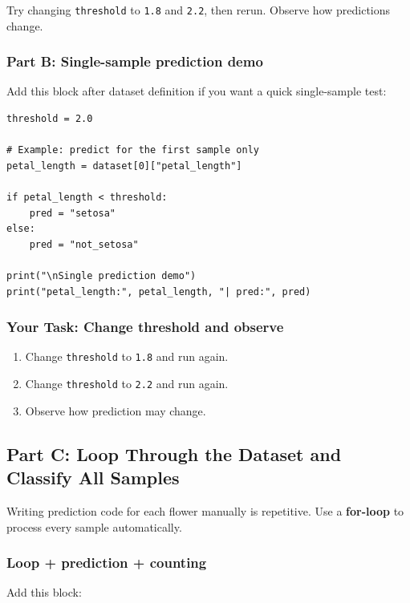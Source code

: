 Try changing \texttt{threshold} to \texttt{1.8} and \texttt{2.2}, then rerun. Observe how predictions change.

\subsubsection{Part B: Single-sample prediction demo}

Add this block after dataset definition if you want a quick single-sample test:

\begin{verbatim}
threshold = 2.0

# Example: predict for the first sample only
petal_length = dataset[0]["petal_length"]

if petal_length < threshold:
    pred = "setosa"
else:
    pred = "not_setosa"

print("\nSingle prediction demo")
print("petal_length:", petal_length, "| pred:", pred)
\end{verbatim}

\subsubsection{Your Task: Change threshold and observe}
\begin{enumerate}
    \item Change \texttt{threshold} to \texttt{1.8} and run again.
    \item Change \texttt{threshold} to \texttt{2.2} and run again.
    \item Observe how prediction may change.
\end{enumerate}

\newpage
\subsection{Part C: Loop Through the Dataset and Classify All Samples}

Writing prediction code for each flower manually is repetitive. Use a \textbf{for-loop} to process every sample automatically.

\subsubsection{Loop + prediction + counting}

Add this block:


